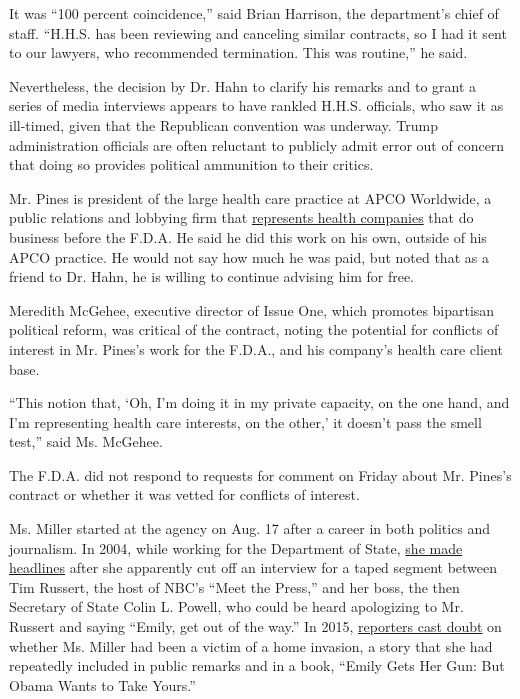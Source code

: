 It was ``100 percent coincidence,'' said Brian Harrison, the
department's chief of staff. ``H.H.S. has been reviewing and canceling
similar contracts, so I had it sent to our lawyers, who recommended
termination. This was routine,'' he said.

Nevertheless, the decision by Dr. Hahn to clarify his remarks and to
grant a series of media interviews appears to have rankled H.H.S.
officials, who saw it as ill-timed, given that the Republican convention
was underway. Trump administration officials are often reluctant to
publicly admit error out of concern that doing so provides political
ammunition to their critics.

Mr. Pines is president of the large health care practice at APCO
Worldwide, a public relations and lobbying firm that
\href{https://apcoworldwide.com/sectors/health/}{represents health
companies} that do business before the F.D.A. He said he did this work
on his own, outside of his APCO practice. He would not say how much he
was paid, but noted that as a friend to Dr. Hahn, he is willing to
continue advising him for free.

Meredith McGehee, executive director of Issue One, which promotes
bipartisan political reform, was critical of the contract, noting the
potential for conflicts of interest in Mr. Pines's work for the F.D.A.,
and his company's health care client base.

``This notion that, `Oh, I'm doing it in my private capacity, on the one
hand, and I'm representing health care interests, on the other,' it
doesn't pass the smell test,'' said Ms. McGehee.

The F.D.A. did not respond to requests for comment on Friday about Mr.
Pines's contract or whether it was vetted for conflicts of interest.

Ms. Miller started at the agency on Aug. 17 after a career in both
politics and journalism. In 2004, while working for the Department of
State,
\href{https://www.nytimes3xbfgragh.onion/2004/05/17/international/powells-interview-is-cut-off.html?smid=nytcore-ios-share}{she
made headlines} after she apparently cut off an interview for a taped
segment between Tim Russert, the host of NBC's ``Meet the Press,'' and
her boss, the then Secretary of State Colin L. Powell, who could be
heard apologizing to Mr. Russert and saying ``Emily, get out of the
way.'' In 2015,
\href{https://www.washingtonpost.com/blogs/erik-wemple/wp/2015/03/03/additional-document-casts-doubt-on-home-invasion-of-local-fox-reporter/}{reporters
cast doubt} on whether Ms. Miller had been a victim of a home invasion,
a story that she had repeatedly included in public remarks and in a
book, ``Emily Gets Her Gun: But Obama Wants to Take Yours.''

